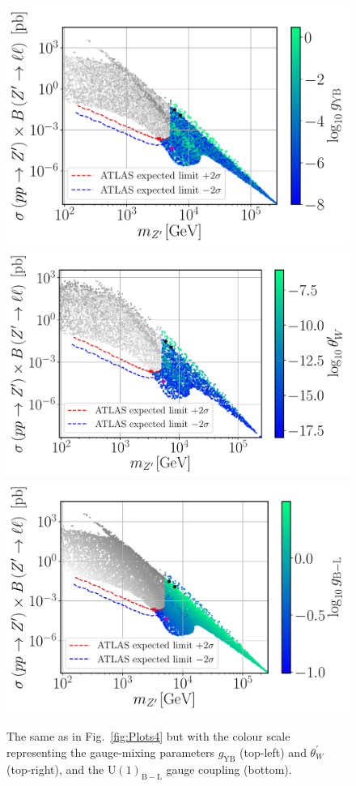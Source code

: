 \documentclass[a4paper,11pt]{article}
\renewcommand{\(}{\left(}
\renewcommand{\)}{\right)}
\renewcommand{\[}{\left[}
\renewcommand{\]}{\right]}
\newcommand{\U}[1]{\mathrm{U}(1)_{\mathrm{#1}}}			%
\newcommand{\ro}[1]{\textrm{#1}}
\begin{document}
\begin{figure}[!htb]
	\centering
	\includegraphics[scale=0.37]{mZp_Xsec_gYB.pdf}
	\includegraphics[scale=0.37]{mZp_Xsec_twp.pdf}
	\includegraphics[scale=0.37]{mZp_Xsec_gBL.pdf}	
	\caption{The same as in Fig.~\ref{fig:Plots4} but with the colour scale representing the gauge-mixing parameters $g_\ro{YB}$ (top-left) and $\theta_W^\prime$ (top-right), and the $\U{B-L}$ gauge coupling (bottom).}
	\label{fig:Plots3}
\end{figure}	
\end{document}
